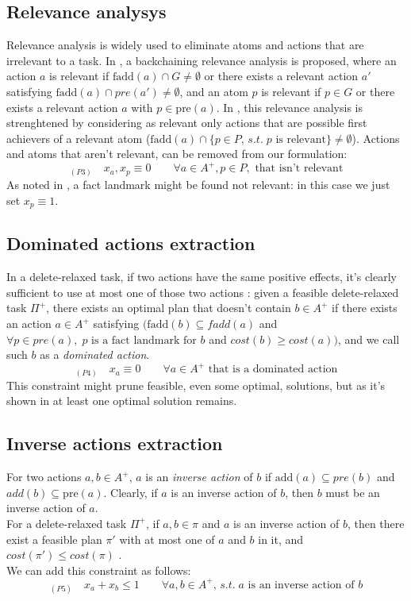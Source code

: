 \subsection{Relevance analysys}
Relevance analysis is widely used to eliminate atoms and actions that are irrelevant to a task. In \cite{Imai_15}, a backchaining relevance analysis is proposed, where an action $a$ is relevant if $\mbox{fadd}(a)\cap G\not=\emptyset$ or there exists a relevant action $a'$ satisfying $\mbox{fadd}(a)\cap pre(a')\not=\emptyset$, and an atom $p$ is relevant if $p\in G$ or there exists a relevant action $a$ with $p\in \mbox{pre}(a)$.
In \cite{MLM_Haslum_12}, this relevance analysis is strenghtened by considering as relevant only actions that are possible first achievers of a relevant atom ($\mbox{fadd}(a)\cap\{p\in P,\,s.t.\;p\mbox{ is relevant}\}\not=\emptyset$).
Actions and atoms that aren't relevant, can be removed from our formulation:
$$_{(P3)}\quad x_a,x_p\equiv0\qquad\forall a\in A^+,p\in P,\mbox{ that isn't relevant}$$
As noted in \cite{Imai_15}, a fact landmark might be found not relevant: in this case we just set $x_p\equiv1$.

\subsection{Dominated actions extraction}
In a delete-relaxed task, if two actions have the same positive effects, it's clearly sufficient to use at most one of those two actions \cite{Imai_15}: given a feasible delete-relaxed task $\Pi^+$, there exists an optimal plan that doesn't contain $b\in A^+$ if there exists an action $a\in A^+$ satisfying $(\mbox{fadd}(b)\subseteq fadd(a)$ and $\forall p\in pre(a),\;p\mbox{ is a fact landmark for }b$ and $cost(b)\geq cost(a))$, and we call such $b$ as a \textit{dominated action}.
$$_{(P4)}\quad x_a\equiv0\qquad\forall a\in A^+\mbox{ that is a dominated action}$$
This constraint might prune feasible, even some optimal, solutions, but as it's shown in \cite{Imai_15} at least one optimal solution remains. 

\subsection{Inverse actions extraction}
For two actions $a,b\in A^+$, $a$ is an \textit{inverse action} of $b$ if $\mbox{add}(a)\subseteq pre(b)$ and $add(b)\subseteq \mbox{pre}(a)$.
Clearly, if $a$ is an inverse action of $b$, then $b$ must be an inverse action of $a$.\\
For a delete-relaxed task $\Pi^+$, if $a,b\in\pi$ and $a$ is an inverse action of $b$, then there exist a feasible plan $\pi'$ with at most one of $a$ and $b$ in it, and $cost(\pi')\leq cost(\pi)$ \cite{Imai_15}.\\
We can add this constraint as follows:
$$_{(P5)}\quad x_a+x_b\leq1\qquad\forall a,b\in A^+,\,s.t.\;a\mbox{ is an inverse action of }b$$

